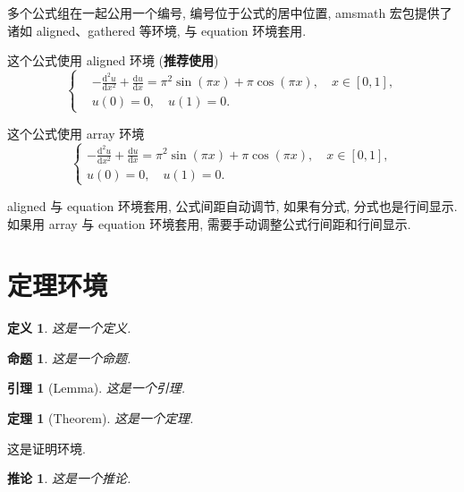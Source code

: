 \documentclass[openany,twoside,12pt]{book}
\makeatletter
\theoremstyle{plain}
\newtheorem{definition}{定义}[chapter]
\newtheorem{proposition}{命题}[chapter]
\newtheorem{lemma}{引理}[chapter]
\newtheorem{theorem}{定理}[chapter]
\newtheorem{corollary}{推论}[chapter]
\renewcommand{\proofname}{证明}
\renewenvironment{proof}[1][\proofname]{\par
  \pushQED{\qed}%
  \normalfont \topsep6\p@\@plus6\p@\relax
  \trivlist
  \item[\hskip\labelsep
        \bfseries
    #1\@addpunct{\,:\,}]\ignorespaces
}{%
  \popQED\endtrivlist\@endpefalse
}
\makeatother
\begin{document}
多个公式组在一起公用一个编号, 编号位于公式的居中位置, amsmath 宏包提供了诸如 aligned、gathered 等环境, 与 equation 环境套用.

这个公式使用 aligned 环境 (\textbf{推荐使用})
\begin{equation}\label{eqn:1}
\left\{\begin{aligned}
  &-\frac{\mathrm{d}^{2} u}{\mathrm{d} x^{2}}+\frac{\mathrm{d} u}{\mathrm{d} x}=\pi^{2} \sin (\pi x)+\pi \cos (\pi x),\quad x \in [0,1], \\
  &u(0)=0,\quad u(1)=0.
\end{aligned} \right.
\end{equation}

这个公式使用 array 环境
\begin{equation}\label{eqn:2}
\left\{\begin{array}{l}
\displaystyle
-\frac{\mathrm{d}^{2} u}{\mathrm{d} x^{2}}+\frac{\mathrm{d} u}{\mathrm{d} x}=\pi^{2} \sin (\pi x)+\pi \cos (\pi x),\quad x \in [0,1], \\[6pt]
u(0)=0,\quad u(1)=0.
\end{array} \right.
\end{equation}

aligned 与 equation 环境套用, 公式间距自动调节, 如果有分式, 分式也是行间显示. 如果用 array 与 equation 环境套用, 需要手动调整公式行间距和行间显示.



\section{定理环境}

\begin{definition}
这是一个定义.
\end{definition}

\begin{proposition}
这是一个命题.
\end{proposition}

\begin{lemma}[Lemma]\label{lemma1}
这是一个引理.
\end{lemma}

\begin{theorem}[Theorem]
这是一个定理.
\end{theorem}
\begin{proof}
这是证明环境.
\end{proof}

\begin{corollary}
这是一个推论.
\end{corollary}
\end{document}
